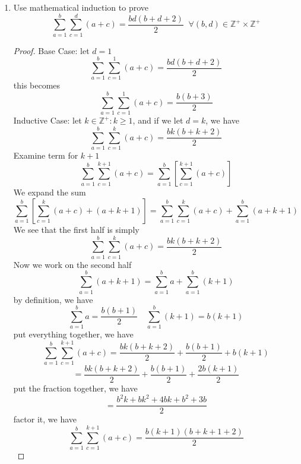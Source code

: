 \documentclass[12pt]{article}
\newcommand{\Z}{\mathbb{Z}}
\newcommand{\sqbkt}[1]{\left[ #1 \right]}
\begin{document}
\begin{enumerate}
    \item Use mathematical induction to prove
    \[
    \sum_{a=1}^{b}\sum_{c=1}^{d} (a+c) = \frac{bd(b+d+2)}{2} \;\; \forall (b,d) \in \Z^+ \times \Z^+
    \]
    \begin{proof}
        Base Case: let $d=1$
        \[
        \sum_{a=1}^{b}\sum_{c=1}^{1} (a+c) = \frac{bd(b+d+2)}{2}
        \]
        this becomes
        \[
        \sum_{a=1}^{b}\sum_{c=1}^{1} (a+c) = \frac{b(b+3)}{2}
        \]
        Inductive Case: let $k \in \Z^+ : k \geq 1$, and if we let $d=k$, we have
        \[
        \sum_{a=1}^{b}\sum_{c=1}^{k} (a+c) = \frac{bk(b+k+2)}{2}
        \]
        Examine term for $k+1$
        \[
        \sum_{a=1}^{b}\sum_{c=1}^{k+1}(a+c)
        =\sum_{a=1}^{b}\sqbkt{\sum_{c=1}^{k+1}(a+c)}
        \]
        We expand the sum
        \[
        \sum_{a=1}^{b}\sqbkt{\sum_{c=1}^{k}(a+c) + (a+k+1)}
        = \sum_{a=1}^{b}\sum_{c=1}^{k}(a+c) + \sum_{a=1}^{b}(a+k+1)
        \]
        We see that the first half is simply 
        \[
        \sum_{a=1}^{b}\sum_{c=1}^{k}(a+c) = \frac{bk(b+k+2)}{2}
        \]
        Now we work on the second half
        \[
        \sum_{a=1}^{b}(a+k+1) = \sum_{a=1}^{b} a + \sum_{a=1}^{b} (k+1)
        \]
        by definition, we have
        \[
        \sum_{a=1}^{b} a = \frac{b(b+1)}{2} \quad \sum_{a=1}^{b} (k+1) = b(k+1)
        \]
        put everything together, we have 
        \[
        \sum_{a=1}^{b}\sum_{c=1}^{k+1}(a+c) = \frac{bk(b+k+2)}{2} + \frac{b(b+1)}{2} + b(k+1)
        \]
        \[
        = \frac{bk(b+k+2)}{2} + \frac{b(b+1)}{2}  + \frac{2b(k+1)}{2}
        \]
        put the fraction together, we have
        \[
        = \frac{b^2k+bk^2+4bk+b^2+3b}{2}
        \]
        factor it, we have
        \[
        \sum_{a=1}^{b}\sum_{c=1}^{k+1}(a+c)=
        \frac{b(k+1)(b+k+1+2)}{2}
        \]
        
    
        
    \end{proof}
    
    \newpage
    

\end{enumerate}
\end{document}
